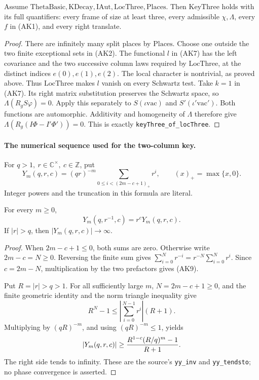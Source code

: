 \begin{srproposition}
\label{prop:sr-source-key-three-producer}
Assume \(\mathrm{ThetaBasic},\mathrm{KDecay},\mathrm{IAut},
\mathrm{LocThree},\mathrm{Places}\).
Then \(\mathrm{KeyThree}\) holds with its full quantifiers:
every frame of size at least three, every admissible
\(\chi,\Lambda\), every \(f\) in (AK1), and every right translate.
\end{srproposition}
\begin{proof}
There are infinitely many split places by \(\mathrm{Places}\).
Choose one outside the two finite exceptional sets in (AK2).
The functional \(l\) in (AK7) has the left covariance and the two
successive column laws required by \(\mathrm{LocThree}\), at the
distinct indices \(e(0),e(1),e(2)\).
The local character is nontrivial, as proved above.
Thus \(\mathrm{LocThree}\) makes \(l\) vanish on every Schwartz test.
Take \(k=1\) in (AK7). Its right matrix substitution preserves the
Schwartz space, so \(\Lambda(R_gS\varphi)=0\).
Apply this separately to \(S(\iota\mathrm{vac})\) and
\(S'(\iota'\mathrm{vac}')\).
Both functions are automorphic. Additivity and homogeneity of
\(\Lambda\) therefore give
\(\Lambda(R_g(I\Phi-I'\Phi'))=0\).
This is exactly \texttt{keyThree\_of\_locThree}.
\end{proof}

\paragraph{The numerical sequence used for the two-column key.}
For \(q>1,\ r\in\mathbb C^\times,\ c\in\mathbb Z\), put
\[
 Y_m(q,r,c)=(qr)^{-m}
       \sum_{0\le i<(2m-c+1)_+}r^i,\qquad
                     (x)_+=\max\{x,0\}.
 \tag{AK8}\label{eq:sr-source-key-two-sequence}
\]
Integer powers and the truncation in this formula are literal.

\begin{srlemma}\label{lem:sr-source-key-two-sequence}
For every \(m\ge0\),
\[
 Y_m(q,r^{-1},c)=r^cY_m(q,r,c).
 \tag{AK9}\label{eq:sr-source-key-two-inversion}
\]
If \(|r|>q\), then \(|Y_m(q,r,c)|\to\infty\).
\end{srlemma}
\begin{proof}
When \(2m-c+1\le0\), both sums are zero.
Otherwise write \(2m-c=N\ge0\).
Reversing the finite sum gives
\(\sum_{i=0}^Nr^{-i}=r^{-N}\sum_{i=0}^Nr^i\).
Since \(c=2m-N\), multiplication by the two prefactors gives (AK9).

Put \(R=|r|>q>1\).
For all sufficiently large \(m\), \(N=2m-c+1\ge0\), and
the finite geometric identity and the norm triangle inequality give
\[
 R^N-1
   \le \left|\sum_{i=0}^{N-1}r^i\right|(R+1).
\]
Multiplying by \((qR)^{-m}\), and using
\((qR)^{-m}\le1\), yields
\[
 |Y_m(q,r,c)|
       \ge {R^{1-c}(R/q)^m-1\over R+1}.
\]
The right side tends to infinity.
These are the source's \texttt{yy\_inv} and
\texttt{yy\_tendsto}; no phase convergence is asserted.
\end{proof}

